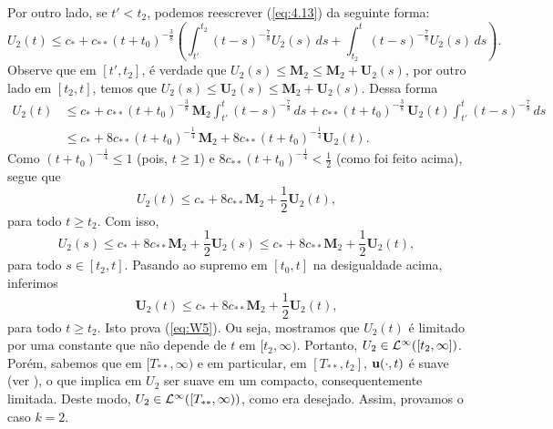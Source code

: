 \begin{prf}
    Por outro lado, se $t'< t_2$, podemos reescrever (\ref{eq:4.13}) da seguinte forma:
    \[
        U_2(t) \leqslant c_* + c_{**} (t + t_0)^{-\frac{3}{8}} \left( \int_{t'}^{t_2} (t - s)^{-\frac{7}{8}} U_2(s) \,ds + \int_{t_2}^t (t - s)^{-\frac{7}{8}}U_2(s) \,ds \right).
    \]
    Observe que em $[t',t_2]$, é verdade que $U_2(s) \leqslant \mathbf{M}_2 \leqslant \mathbf{M}_2 + \mathbf{U}_2(s)$, por outro lado em $[t_2, t]$, temos que $U_2(s) \leqslant \mathbf{U}_2(s) \leqslant \mathbf{M}_2 + \mathbf{U}_2(s)$.
    Dessa forma
    \[
        \begin{aligned}
            U_2(t) &\leqslant c_* + c_{**} (t + t_0)^{-\frac{3}{8}} \, \mathbf{M}_2\int_{t'}^{t} (t - s)^{-\frac{7}{8}}\,ds + c_{**} (t + t_0)^{-\frac{3}{8}}\,\mathbf{U}_2(t)\int_{t'}^{t} (t - s)^{-\frac{7}{8}}\,ds\\
            &\leqslant c_* + 8c_{**} (t+ t_0)^{-\frac{1}{4}}\, \mathbf{M}_2 + 8 c_{**}(t+t_0)^{-\frac{1}{4}}\mathbf{U}_2(t).
        \end{aligned}
    \]
    Como $(t + t_0)^{-\frac{1}{4}} \leqslant 1$ (pois, $t \geqslant 1$) e $8c_{**} (t+t_0)^{-\frac{1}{4}} < \frac{1}{2}$ (como foi feito acima), segue que
    \[
        U_2(t) \leqslant c_* + 8c_{**} \mathbf{M}_2 + \frac{1}{2} \mathbf{U}_2(t),
    \]
    para todo $t \geqslant t_2$.
    Com isso,
    \[
        U_2(s) \leqslant c_* + 8c_{**} \mathbf{M}_2 + \frac{1}{2} \mathbf{U}_2(s) \leqslant c_* + 8c_{**}\mathbf{M}_2 + \frac{1}{2}\mathbf{U}_2(t),
    \]
    para todo $s \in [t_2,t]$.
    Pasando ao supremo em $[t_0,t]$ na desigualdade acima, inferimos
    \[
        \mathbf{U}_2(t) \leqslant c_* + 8c_{**} \mathbf{M}_2 + \frac{1}{2} \mathbf{U}_2(t),
    \]
    para todo $t \geqslant t_2$. Isto prova (\ref{eq:W5}).
    Ou seja, mostramos que $U_2(t)$ é limitado por uma constante que não depende de $t$ em $[t_2, \infty)$. Portanto, $U_2 \in \mathcal{L}^\infty([t_2, \infty])$. Porém, sabemos que em $[T_{**}, \infty)$ e em particular, em $[T_{**}, t_2]$, $\mathbf{u}(\cdot,t)$ é suave (ver \cite{leray-fluid}), o que implica em $U_2$ ser suave em um compacto, consequentemente limitada.
    Deste modo, $U_2 \in \mathcal{L}^\infty([T_{**},\infty))$, como era desejado. Assim, provamos o caso $k = 2$.


\end{prf}
